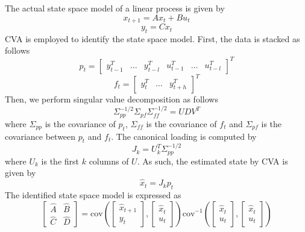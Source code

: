 \documentclass[12pt]{article}
\date{}
\begin{document}
The actual state space model of a linear process is given by
\begin{equation}\label{eq::state}
x_{t+1}=Ax_t+Bu_t
\end{equation}
\begin{equation}\label{eq:measurement}
y_t=Cx_t
\end{equation}
CVA is employed to identify the state space model. First, the data is stacked as follows
\begin{equation}
p_t=\begin{bmatrix}y_{t-1}^T & \ldots & y_{t-l}^T& u_{t-1}^T & \ldots & u_{t-l}^T\end{bmatrix}^T
\end{equation}
\begin{equation}
f_t=\begin{bmatrix}y_{t}^T & \ldots & y_{t+h}^T\end{bmatrix}^T
\end{equation}
Then, we perform singular value decomposition as follows
\begin{equation}
\Sigma_{pp}^{-1/2}\Sigma_{pf}\Sigma_{ff}^{-1/2}=UDV^T
\end{equation}
where $\Sigma_{pp}$ is the covariance of $p_t$, $\Sigma_{ff}$ is the covariance of $f_t$ and $\Sigma_{pf}$ is the covariance between $p_t$ and $f_t$. The canonical loading is computed by
\begin{equation}
J_k=U_k^T\Sigma_{pp}^{-1/2}
\end{equation}
where $U_k$ is the first $k$ columns of $U$. As such, the estimated state by CVA is given by
\begin{equation}
\hat{x}_t= J_kp_t
\end{equation}
The identified state space model is expressed as 
\begin{equation} \label{eq:identified}
\begin{bmatrix} \hat{A} & \hat{B}\\
                \hat{C} & \hat{D} \end{bmatrix} = \text{cov} (\begin{bmatrix} \hat{x}_{t+1}\\ 
                                                                              y_t \end{bmatrix}, \begin{bmatrix} \hat{x}_{t}\\ 
                                                                                                                u_t \end{bmatrix}) \text{cov}^{-1} (\begin{bmatrix} \hat{x}_{t}\\ 
                                                                                                                                                                    u_t \end{bmatrix},\begin{bmatrix} \hat{x}_{t}\\ u_t \end{bmatrix})
\end{equation}
\end{document}
